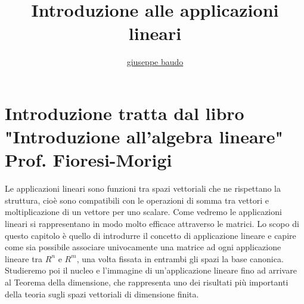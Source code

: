 \documentclass[a4paper,10pt]{article}
\title{Introduzione alle applicazioni lineari}
\author{\href{http://www.baudo.hol.es}{giuseppe baudo}}
\begin{document}
\maketitle

\section{Introduzione tratta dal libro "Introduzione all'algebra lineare" Prof. Fioresi-Morigi}
Le applicazioni lineari sono funzioni tra spazi vettoriali che ne rispettano la struttura, cioè sono compatibili con le operazioni di somma tra vettori e moltiplicazione di un
vettore per uno scalare. Come vedremo le applicazioni lineari si rappresentano in modo molto efficace attraverso le matrici. Lo scopo di questo capitolo è quello di introdurre
il concetto di applicazione lineare e capire come sia possibile associare univocamente una matrice ad ogni applicazione lineare tra $R^n$ e $R^m$, una volta fissata in entrambi
gli spazi la base canonica. Studieremo poi il nucleo e l'immagine di un'applicazione lineare fino ad arrivare al Teorema della dimensione, che rappresenta uno dei risultati più
importanti della teoria sugli spazi vettoriali di dimensione finita.
\end{document}
